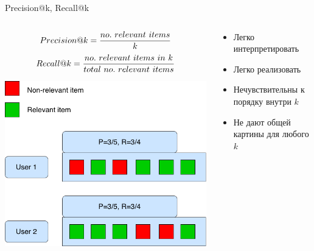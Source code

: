 \documentclass[11pt,aspectratio=169,handout]{beamer}
\begin{document}
\begin{frame}{Precision@k, Recall@k}

\begin{columns}
\begin{column}{0.5\textwidth}
   \begin{tcolorbox}[colback=gray!5,colframe=gray!80,title=]
\[
      Precision@k = \frac{no.\ relevant\ items}{k}\\
\]
\[
      Recall@k = \frac{no.\ relevant\ items\ in\ k}{total\ no.\ relevant\ items}\\
\]
   \end{tcolorbox}
   \begin{center}
		\includegraphics[scale=0.22]{images/precision-recall.png}
   \end{center}
\end{column}
\begin{column}{0.4\textwidth}
    \begin{tcolorbox}[colback=info!5,colframe=info!80,title=]
      \begin{itemize}
      \item Легко интерпретировать
      \item Легко реализовать
      \end{itemize}
    \end{tcolorbox}
    \begin{tcolorbox}[colback=warn!5,colframe=warn!80,title=]
      \begin{itemize}
      \item Нечувствительны к порядку внутри $k$
      \item Не дают общей картины для любого $k$
      \end{itemize}
    \end{tcolorbox}
\end{column}
\end{columns}

\end{frame}
\end{document}
